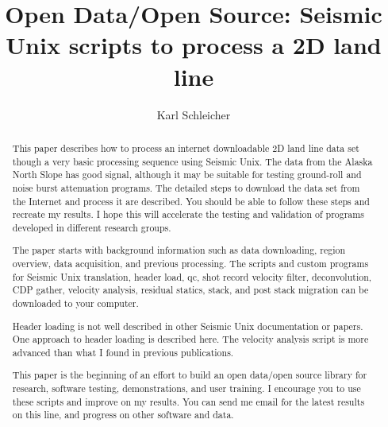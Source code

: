 
\title{Open Data/Open Source: Seismic Unix scripts to process a 2D land line}               %
\author{Karl Schleicher}

\address{
k\_schleicher@hotmail.com \\
John A. and Katherine G. Jackson School of Geosciences \\
The University of Texas at Austin \\
University Station, Box X \\
Austin, TX 78713-8924}

\maketitle

\begin{abstract}
This paper describes how to process an internet downloadable 2D land 
line data set though a very basic processing sequence using Seismic 
Unix. The data from the Alaska North Slope has good signal, 
although it may be suitable for testing ground-roll and noise burst 
attenuation programs.  The detailed steps to download the data set from 
the Internet and process it are described.  You should be able to 
follow these steps and recreate my results.  I hope this will 
accelerate the testing and validation of programs developed in different
research groups.
\par
The paper starts with background information such as data downloading,
region overview, data acquisition, and previous processing.  The
scripts and custom programs for Seismic Unix translation, header load, 
qc, shot record velocity filter, deconvolution, CDP gather, velocity 
analysis, residual statics, stack, and post stack migration can be 
downloaded to your computer.

Header loading is not well described in other Seismic Unix documentation
or papers.  One approach to header loading is described here.  The velocity
analysis script is more advanced than what I found in previous publications.

This paper is the beginning of an effort to build an open data/open source 
library for research, software testing, demonstrations, and user training.  
I encourage you to use these scripts and improve on my results.  You can send 
me email for the latest results on this line, and progress on other software 
and data.
\end{abstract}

